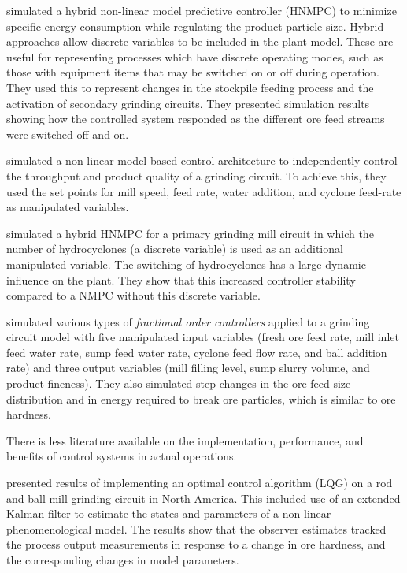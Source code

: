 \cite{estrada_hybrid_2014} simulated a hybrid non-linear model predictive controller (HNMPC) to minimize specific energy consumption while regulating the product particle size. Hybrid approaches allow discrete variables to be included in the plant model. These are useful for representing processes which have discrete operating modes, such as those with equipment items that may be switched on or off during operation. They used this to represent changes in the stockpile feeding process and the activation of secondary grinding circuits. They presented simulation results showing how the controlled system responded as the different ore feed streams were switched off and on.

\cite{le_roux_throughput_2016} simulated a non-linear model-based control architecture to independently control the throughput and product quality of a grinding circuit. To achieve this, they used the set points for mill speed, feed rate, water addition, and cyclone feed-rate as manipulated variables.

\cite{botha_hybrid_2018} simulated a hybrid HNMPC for a primary grinding mill circuit in which the number of hydrocyclones (a discrete variable) is used as an additional manipulated variable. The switching of hydrocyclones has a large dynamic influence on the plant. They show that this increased controller stability compared to a NMPC without this discrete variable.

\cite{aguila-camacho_control_2017} simulated various types of \textit{fractional order controllers} applied to a grinding circuit model with five manipulated input variables (fresh ore feed rate, mill inlet feed water rate, sump feed water rate, cyclone feed flow rate, and ball addition rate) and three output variables (mill filling level, sump slurry volume, and product fineness). They also simulated step changes in the ore feed size distribution and in energy required to break ore particles, which is similar to ore hardness.

There is less literature available on the implementation, performance, and benefits of control systems in actual operations.

\cite{herbst_optimal_1988} presented results of implementing an optimal control algorithm (\gls{LQG}) on a rod and ball mill grinding circuit in North America. This included use of an extended Kalman filter to estimate the states and parameters of a non-linear phenomenological model. The results show that the observer estimates tracked the process output measurements in response to a change in ore hardness, and the corresponding changes in model parameters.

